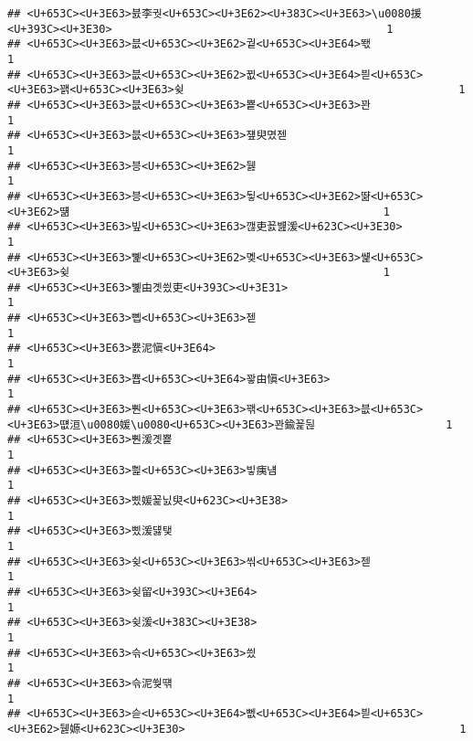 \documentclass[]{article}
\begin{document}
\begin{verbatim}
## <U+653C><U+3E63>븘李궛<U+653C><U+3E62><U+383C><U+3E63>\u0080援<U+393C><U+3E30>                                          1
## <U+653C><U+3E63>븞<U+653C><U+3E62>궡<U+653C><U+3E64>뙋                                                      1
## <U+653C><U+3E63>븞<U+653C><U+3E62>뀞<U+653C><U+3E64>븯<U+653C><U+3E63>꽭<U+653C><U+3E63>슂                                          1
## <U+653C><U+3E63>븞<U+653C><U+3E63>뿉<U+653C><U+3E63>꽌                                                      1
## <U+653C><U+3E63>븞<U+653C><U+3E63>쟾臾몄젣                                                      1
## <U+653C><U+3E63>븡<U+653C><U+3E62>뒗                                                            1
## <U+653C><U+3E63>븡<U+653C><U+3E63>뒿<U+653C><U+3E62>땲<U+653C><U+3E62>떎                                                1
## <U+653C><U+3E63>빞<U+653C><U+3E63>깮吏꾨뱶湲<U+623C><U+3E30>                                                1
## <U+653C><U+3E63>뼱<U+653C><U+3E62>몢<U+653C><U+3E63>썙<U+653C><U+3E63>슂                                                1
## <U+653C><U+3E63>뼱由곗씠吏<U+393C><U+3E31>                                                      1
## <U+653C><U+3E63>뼵<U+653C><U+3E63>젣                                                            1
## <U+653C><U+3E63>뾼泥愼<U+3E64>                                                            1
## <U+653C><U+3E63>뿁<U+653C><U+3E64>꽣由愼<U+3E63>                                                      1
## <U+653C><U+3E63>뿬<U+653C><U+3E63>꽦<U+653C><U+3E63>븞<U+653C><U+3E63>떖洹\u0080媛\u0080<U+653C><U+3E63>꽌鍮꾩뒪                    1
## <U+653C><U+3E63>뿬湲곗뿉                                                            1
## <U+653C><U+3E63>삁<U+653C><U+3E63>빟痍냼                                                        1
## <U+653C><U+3E63>삤媛꾩닔臾<U+623C><U+3E38>                                                      1
## <U+653C><U+3E63>삤湲덇탳                                                            1
## <U+653C><U+3E63>슂<U+653C><U+3E63>씪<U+653C><U+3E63>젣                                                      1
## <U+653C><U+3E63>슂留<U+393C><U+3E64>                                                            1
## <U+653C><U+3E63>슂湲<U+383C><U+3E38>                                                            1
## <U+653C><U+3E63>슦<U+653C><U+3E63>씠                                                            1
## <U+653C><U+3E63>슦泥쒖떆                                                            1
## <U+653C><U+3E63>슫<U+653C><U+3E64>뻾<U+653C><U+3E64>븯<U+653C><U+3E62>뒗嫄<U+623C><U+3E30>                                          1

\end{verbatim}
\end{document}
